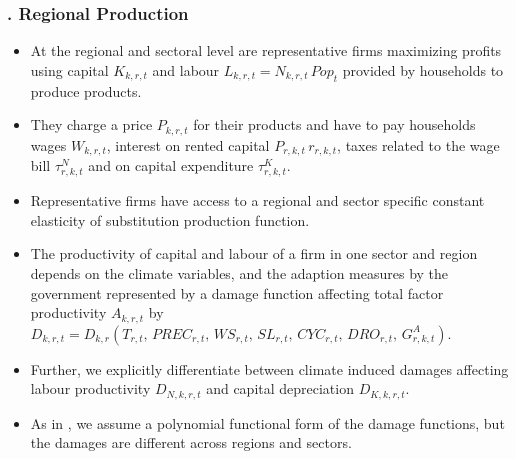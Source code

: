 \documentclass[11pt,aspectratio=169]{beamer}
\begin{document}
\begin{frame}
\frametitle{{\thesection.\thesubsection} Regional Production}
\scriptsize
\begin{itemize}
\item At the regional and sectoral level are representative firms maximizing profits using capital $K_{k,r,t}$ and labour $L_{k,r,t} = N_{k,r,t} \, Pop_{t}$ provided by households to produce products. 
\item They charge a price $P_{k,r,t}$ for their products and have to pay households wages $W_{k,r,t}$, interest on rented capital $P_{r,k,t} \, r_{r,k,t}$, taxes related to the wage bill $\tau^{N}_{r,k,t}$ and on capital expenditure $\tau^{K}_{r,k,t}$.
\item Representative firms have access to a regional and sector specific constant elasticity of substitution production function.
\item The productivity of capital and labour of a firm in one sector and region depends on the climate variables, and the adaption measures by the government represented by a damage function affecting total factor productivity $A_{k,r,t}$ by $D_{k,r,t} = D_{k,r}\left(T_{r,t}, \, PREC_{r,t}, \, WS_{r,t}, \, SL_{r,t}, \, CYC_{r,t}, \, DRO_{r,t}, \, G^{A}_{r,k,t} \right)$.
\item Further, we explicitly differentiate between climate induced damages affecting labour productivity $D_{N,k,r,t}$ and capital depreciation $D_{K,k,r,t}$. 
\item As in \cite{nordhaus1993optimal}, we assume a polynomial functional form of the damage functions, but the damages are different across regions and sectors.
\end{itemize}
\end{frame}
\end{document}

